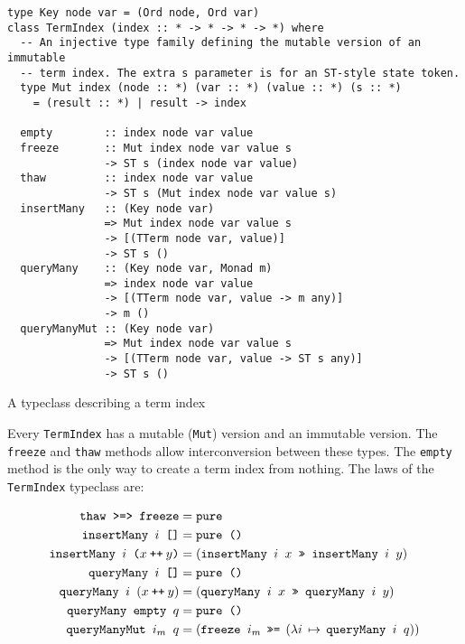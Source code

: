 \documentclass[11pt]{report}
\newcommand{\haskell}[1]{\texttt{#1}}
\renewcommand{\mathtt}[1]{\ensuremath{\texttt{#1}}}
\newcommand{\mtt}[1]{\ensuremath{\mathtt{#1}}}     %
\begin{document}
\begin{listing}[b]
\begin{verbatim}
type Key node var = (Ord node, Ord var)
class TermIndex (index :: * -> * -> * -> *) where
  -- An injective type family defining the mutable version of an immutable
  -- term index. The extra s parameter is for an ST-style state token.
  type Mut index (node :: *) (var :: *) (value :: *) (s :: *)
    = (result :: *) | result -> index

  empty        :: index node var value
  freeze       :: Mut index node var value s
               -> ST s (index node var value)
  thaw         :: index node var value
               -> ST s (Mut index node var value s)
  insertMany   :: (Key node var)
               => Mut index node var value s
               -> [(TTerm node var, value)]
               -> ST s ()
  queryMany    :: (Key node var, Monad m)
               => index node var value
               -> [(TTerm node var, value -> m any)]
               -> m ()
  queryManyMut :: (Key node var)
               => Mut index node var value s
               -> [(TTerm node var, value -> ST s any)]
               -> ST s ()
\end{verbatim}
\caption{A typeclass describing a term index}
\label{lst:term-index}
\end{listing}

Every \haskell{TermIndex} has a mutable (\haskell{Mut}) version and an immutable
version. The \haskell{freeze} and \haskell{thaw} methods allow interconversion
between these types. The \haskell{empty} method is the only way to create a term
index from nothing. The laws of the \haskell{TermIndex} typeclass are:

\vspace{-1em}
\begin{align}
  \mtt{\haskell{thaw} \haskell{>=>} \haskell{freeze}}
  & = \haskell{pure}
  \label{eq:term-index-law-1} \\
  \mtt{\haskell{insertMany} $i$ \haskell{[]}}
  & = \haskell{pure ()}
  \label{eq:term-index-law-2} \\
  \mtt{\haskell{insertMany} $i$ ($x \mathbin{\haskell{++}} y$)}
  & = (\mtt{\haskell{insertMany} $i$ $x$ \haskell{>>} \haskell{insertMany} $i$ $y$})
  \label{eq:term-index-law-3} \\
  \mtt{\haskell{queryMany} $i$ \haskell{[]}}
  & = \haskell{pure ()}
  \label{eq:term-index-law-4} \\
  \mtt{\haskell{queryMany} $i$ $(x \mathbin{\haskell{++}} y)$}
  & = (\mtt{\haskell{queryMany} $i$ $x$ \haskell{>>} \haskell{queryMany} $i$ $y$})
  \label{eq:term-index-law-5} \\
  \mtt{\haskell{queryMany} \haskell{empty} $q$}
  & = \haskell{pure ()}
  \label{eq:term-index-law-6} \\
  \mtt{\haskell{queryManyMut} $i_m$ $q$}
  & = (\mtt{\haskell{freeze} $i_m$}
    \:\: \haskell{>>=} \:\:
    (\lambda i \, \mapsto \, \mtt{\haskell{queryMany} $i$ $q$}))
  \label{eq:term-index-law-7}
\end{align}
\end{document}
